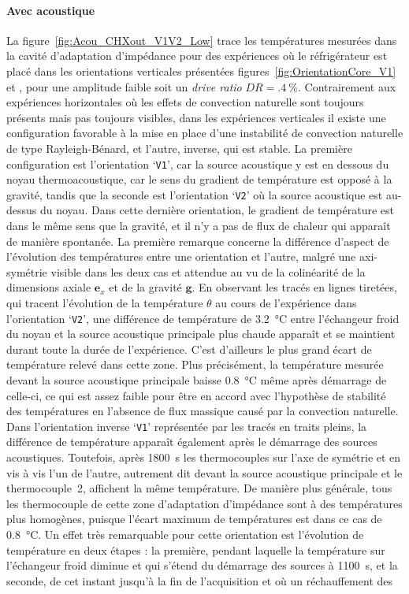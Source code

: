 \paragraph{Avec acoustique}
La figure~\ref{fig:Acou_CHXout_V1V2_Low} trace les températures mesurées dans la cavité d'adaptation d'impédance pour des expériences où le réfrigérateur est placé dans les orientations verticales présentées figures~\ref{fig:OrientationCore_V1} et , pour une amplitude \og faible \fg{} soit un \textit{drive ratio} $DR=\qty{.4}{\percent}$. Contrairement aux expériences horizontales où les effets de convection naturelle sont toujours présents mais pas toujours visibles, dans les expériences verticales il existe une configuration favorable à la mise en place d'une instabilité de convection naturelle de type Rayleigh-Bénard, et l'autre, inverse, qui est stable. La première configuration est l'orientation `\texttt{V1}', car la source acoustique y est en dessous du noyau thermoacoustique, car le sens du gradient de température est opposé à la gravité, tandis que la seconde est l'orientation `\texttt{V2}' où la source acoustique est au-dessus du noyau. Dans cette dernière orientation, le gradient de température est dans le même sens que la gravité, et il n'y a pas de flux de chaleur qui apparaît de manière spontanée. La première remarque concerne la différence d'aspect de l'évolution des températures entre une orientation et l'autre, malgré une axi-symétrie visible dans les deux cas et attendue au vu de la colinéarité de la dimensions axiale $\mathbf e_x$ et de la gravité $\mathbf g$. En observant les tracés en lignes tiretées, qui tracent l'évolution de la température $\theta$ au cours de l'expérience dans l'orientation `\texttt{V2}', une différence de température de \qty{3.2}{\degreeCelsius} entre l'échangeur froid du noyau et la source acoustique principale plus chaude apparaît et se maintient durant toute la durée de l'expérience. C'est d'ailleurs le plus grand écart de température relevé dans cette zone. Plus précisément, la température mesurée devant la source acoustique principale baisse \qty{.8}{\degreeCelsius} même après démarrage de celle-ci, ce qui est assez faible pour être en accord avec l'hypothèse de stabilité des températures en l'absence de flux massique causé par la convection naturelle. Dans l'orientation inverse `\texttt{V1}' représentée par les tracés en traits pleins, la différence de température apparaît également après le démarrage des sources acoustiques. Toutefois, après \qty{1800}{\second} les thermocouples sur l'axe de symétrie et en vis à vis l'un de l'autre, autrement dit devant la source acoustique principale et le thermocouple~2, affichent la même température. De manière plus générale, tous les thermocouple de cette zone d'adaptation d'impédance sont à des températures plus homogènes, puisque l'écart maximum de températures est dans ce cas de \qty{.8}{\degreeCelsius}. Un effet très remarquable pour cette orientation est l'évolution de température en deux étapes : la première, pendant laquelle la température sur l'échangeur froid diminue et qui s'étend du démarrage des sources à \qty{1100}{\second}, et la seconde, de cet instant jusqu'à la fin de l'acquisition et où un réchauffement des 